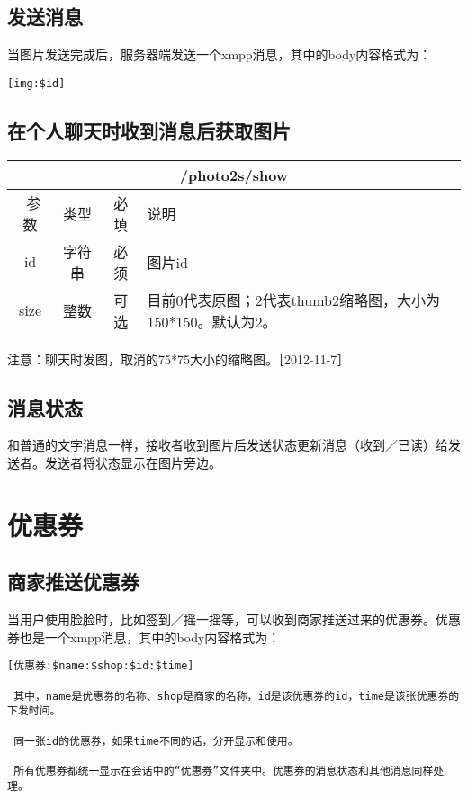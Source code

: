 \documentclass[cs4size]{ctexartutf8}
\begin{document}
\subsection{发送消息}
当图片发送完成后，服务器端发送一个xmpp消息，其中的body内容格式为：

\begin{verbatim}
[img:$id]

\end{verbatim}

\subsection{在个人聊天时收到消息后获取图片}
\begin{table}[H]
   \begin{center}
\begin{tabular}{|c|c|c|p{12cm}|}
\hline
\multicolumn{4}{|c|}{/photo2s/show} \\
\hline\hline
 \  参数  & 类型 & 必填 &  说明  \\
  \hline
 id  & 字符串 & 必须 & 图片id\\
\hline
 size  & 整数 & 可选 &  目前0代表原图；2代表thumb2缩略图，大小为150*150。默认为2。\\ 
\hline
\end{tabular}
   \end{center}
\end{table}

注意：聊天时发图，取消的75*75大小的缩略图。［2012-11-7］


\subsection{消息状态}
和普通的文字消息一样，接收者收到图片后发送状态更新消息（收到／已读）给发送者。发送者将状态显示在图片旁边。






\section{优惠券}

\subsection{商家推送优惠券}
当用户使用脸脸时，比如签到／摇一摇等，可以收到商家推送过来的优惠券。优惠券也是一个xmpp消息，其中的body内容格式为：

\begin{verbatim}
[优惠券:$name:$shop:$id:$time]

 其中，name是优惠券的名称、shop是商家的名称，id是该优惠券的id，time是该张优惠券的下发时间。
 
 同一张id的优惠券，如果time不同的话，分开显示和使用。
 
 所有优惠券都统一显示在会话中的“优惠券”文件夹中。优惠券的消息状态和其他消息同样处理。
\end{verbatim}
\end{document}

